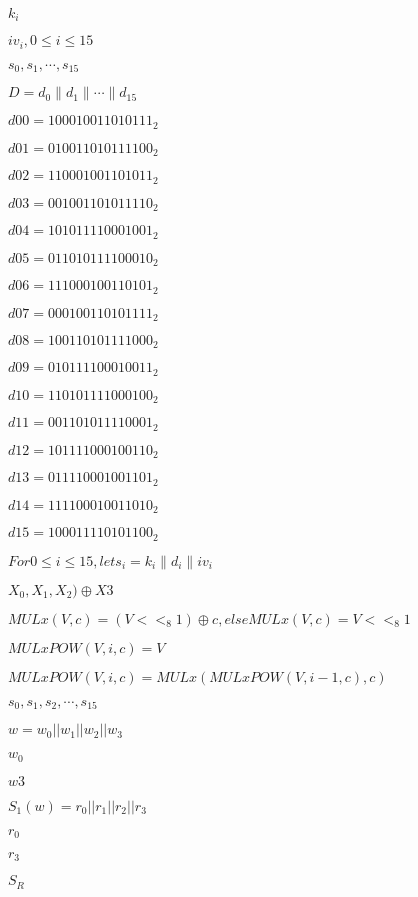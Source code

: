 \documentclass{article}
\begin{document}
$ k_i$
\pagebreak

$ iv_i, 0\leq i\leq 15$
\pagebreak

$ s_0, s_1,\cdots, s_{15}$
\pagebreak

$ D=d_0 \parallel d_1 \parallel \cdots \parallel d_{15}$
\pagebreak

$ d00 = 100010011010111_2 $
\pagebreak

$ d01 = 010011010111100_2 $
\pagebreak

$ d02 = 110001001101011_2 $
\pagebreak

$ d03 = 001001101011110_2 $
\pagebreak

$ d04 = 101011110001001_2 $
\pagebreak

$ d05 = 011010111100010_2 $
\pagebreak

$ d06 = 111000100110101_2 $
\pagebreak

$ d07 = 000100110101111_2 $
\pagebreak

$ d08 = 100110101111000_2 $
\pagebreak

$ d09 = 010111100010011_2 $
\pagebreak

$ d10 = 110101111000100_2 $
\pagebreak

$ d11 = 001101011110001_2 $
\pagebreak

$ d12 = 101111000100110_2 $
\pagebreak

$ d13 = 011110001001101_2 $
\pagebreak

$ d14 = 111100010011010_2 $
\pagebreak

$ d15 = 100011110101100_2 $
\pagebreak

$ For 0 \leq i \leq 15, let s_i=k_i \parallel d_i \parallel iv_i$
\pagebreak

$ X_0, X_1, X_2) \oplus X3$
\pagebreak

$ MULx(V, c) = (V <<_8 1) \oplus c, else MULx(V, c) = V <<_8 1$
\pagebreak

$ MULxPOW(V, i, c) = V$
\pagebreak

$ MULxPOW(V, i, c) = MULx(MULxPOW(V, i-1, c), c)$
\pagebreak

$ s_0, s_1, s_2,\cdots, s_{15}$
\pagebreak

$ w = w_0 || w_1 || w_2 || w_3$
\pagebreak

$ w_0$
\pagebreak

$ w3$
\pagebreak

$ S_1(w)= r_0 || r_1 || r_2 || r_3$
\pagebreak

$ r_0$
\pagebreak

$ r_3$
\pagebreak

$ S_R$
\pagebreak
\end{document}
